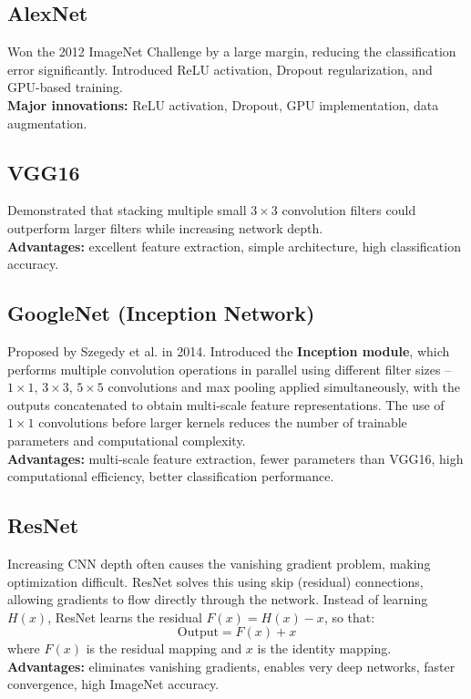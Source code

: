 \documentclass[11pt]{article}
\begin{document}
\subsection*{AlexNet}
Won the 2012 ImageNet Challenge by a large margin, reducing the classification error significantly. Introduced ReLU activation, Dropout regularization, and GPU-based training.\\
\textbf{Major innovations:} ReLU activation, Dropout, GPU implementation, data augmentation.

\subsection*{VGG16}
Demonstrated that stacking multiple small $3\times3$ convolution filters could outperform larger filters while increasing network depth.\\
\textbf{Advantages:} excellent feature extraction, simple architecture, high classification accuracy.

\subsection*{GoogleNet (Inception Network)}
Proposed by Szegedy et al. in 2014. Introduced the \textbf{Inception module}, which performs multiple convolution operations in parallel using different filter sizes -- $1\times1$, $3\times3$, $5\times5$ convolutions and max pooling applied simultaneously, with the outputs concatenated to obtain multi-scale feature representations. The use of $1\times1$ convolutions before larger kernels reduces the number of trainable parameters and computational complexity.\\
\textbf{Advantages:} multi-scale feature extraction, fewer parameters than VGG16, high computational efficiency, better classification performance.

\subsection*{ResNet}
Increasing CNN depth often causes the vanishing gradient problem, making optimization difficult. ResNet solves this using skip (residual) connections, allowing gradients to flow directly through the network. Instead of learning $H(x)$, ResNet learns the residual $F(x) = H(x) - x$, so that:
\[
\text{Output} = F(x) + x
\]
where $F(x)$ is the residual mapping and $x$ is the identity mapping.\\
\textbf{Advantages:} eliminates vanishing gradients, enables very deep networks, faster convergence, high ImageNet accuracy.
\end{document}
